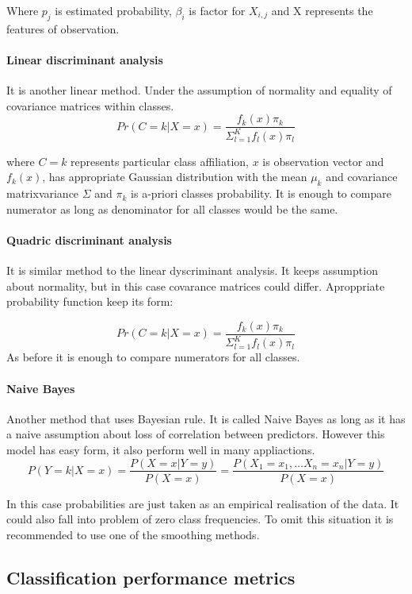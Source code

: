 \documentclass[10pt]{article}\usepackage[]{graphicx}\usepackage[]{color}
\begin{document}
Where $p_j$ is estimated probability, $\beta_i$ is factor for $X_{i,j}$ and X
represents the features of observation. 
\paragraph{Linear discriminant analysis}
It is another linear method. Under the assumption of normality and equality of 
covariance matrices within classes.
$$
  Pr(C=k|X=x) = \frac{f_k(x)\pi_k}{\Sigma_{l=1}^K f_l(x)\pi_l}
$$
  
where $C = k$ represents particular class affiliation, $x$ is observation vector 
and $f_k(x)$, has appropriate Gaussian distribution with the mean $\mu_k$ and 
covariance matrixvariance $\Sigma$ and $\pi_k$ is a-priori classes probability. 
It is enough to compare numerator as long as denominator for all classes would 
be the same.
 
\paragraph{Quadric discriminant analysis}
It is similar method to the linear dyscriminant analysis. It keeps assumption 
about normality, but in this case covarance matrices could differ. 
Aproppriate probability function keep its form: 
  
$$
  Pr(C=k|X=x) = \frac{f_k(x)\pi_k}{\Sigma_{l=1}^K f_l(x)\pi_l}
$$
As before it is enough to compare numerators for all classes.
\paragraph{Naive Bayes}
Another method that uses Bayesian rule. It is called Naive Bayes as long as it 
has a naive assumption about loss of correlation between predictors. 
However this model has easy form, it also perform well in many appliactions. 
$$
  P(Y=k|X=x) = \frac{P(X=x|Y=y)}{P(X=x)} = \frac{P(X_1=x_1,\ldots X_n=x_n|Y=y)}{P(X=x)}  
$$
  
In this case probabilities are just taken as an empirical realisation of the 
data.
It could also fall into problem of zero class frequencies. To omit this 
situation it is recommended to use one of the smoothing methods.

\clearpage
\subsection{Classification performance metrics}
\end{document}
